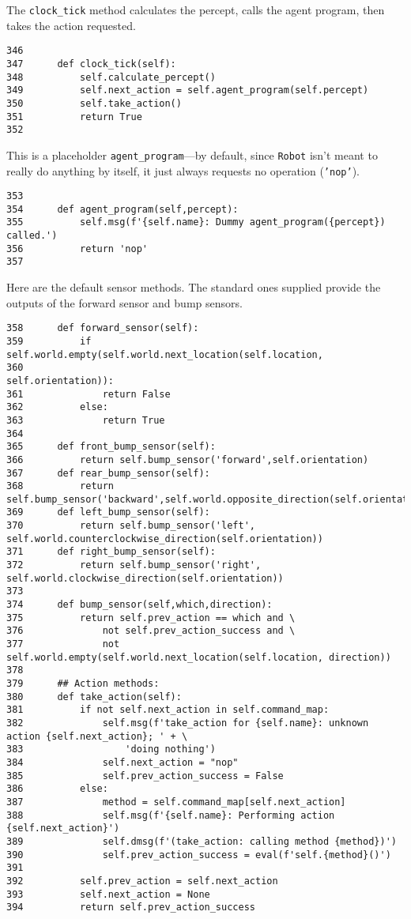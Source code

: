 \documentclass[11pt]{tufte-handout}
\begin{document}
The \texttt{clock\_tick} method calculates the percept, calls the agent program, then takes the action requested.

\begin{verbatim}
346  
347      def clock_tick(self):
348          self.calculate_percept()
349          self.next_action = self.agent_program(self.percept)
350          self.take_action()
351          return True
352  
\end{verbatim}

This is a placeholder \texttt{agent\_program}---by default, since \texttt{Robot} isn't meant to really do anything by itself, it just always requests no operation (\texttt{'nop'}).

\begin{verbatim}
353  
354      def agent_program(self,percept):
355          self.msg(f'{self.name}: Dummy agent_program({percept}) called.')
356          return 'nop'
357  
\end{verbatim}

Here are the default sensor methods.  The standard ones supplied provide the outputs of the forward sensor and bump sensors.

\begin{verbatim}
358      def forward_sensor(self):
359          if self.world.empty(self.world.next_location(self.location,
360                                                       self.orientation)):
361              return False
362          else:
363              return True
364  
365      def front_bump_sensor(self):
366          return self.bump_sensor('forward',self.orientation)
367      def rear_bump_sensor(self):
368          return self.bump_sensor('backward',self.world.opposite_direction(self.orientation))
369      def left_bump_sensor(self):
370          return self.bump_sensor('left', self.world.counterclockwise_direction(self.orientation))
371      def right_bump_sensor(self):
372          return self.bump_sensor('right', self.world.clockwise_direction(self.orientation))
373  
374      def bump_sensor(self,which,direction):
375          return self.prev_action == which and \
376              not self.prev_action_success and \
377              not self.world.empty(self.world.next_location(self.location, direction))
378  
379      ## Action methods:
380      def take_action(self):
381          if not self.next_action in self.command_map:
382              self.msg(f'take_action for {self.name}: unknown action {self.next_action}; ' + \
383                  'doing nothing')
384              self.next_action = "nop"
385              self.prev_action_success = False
386          else:
387              method = self.command_map[self.next_action]
388              self.msg(f'{self.name}: Performing action {self.next_action}')
389              self.dmsg(f'(take_action: calling method {method})')
390              self.prev_action_success = eval(f'self.{method}()')
391  
392          self.prev_action = self.next_action
393          self.next_action = None
394          return self.prev_action_success
\end{verbatim}
\end{document}
